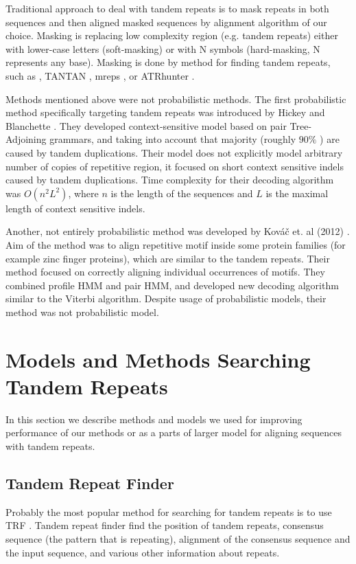 Traditional approach to deal with tandem repeats is to mask repeats in both
sequences and then aligned masked sequences by alignment algorithm of our
choice. Masking is replacing low complexity region (e.g. tandem repeats) either
with lower-case letters (soft-masking) or with N symbols (hard-masking, N
represents any base). Masking is done by method for finding tandem repeats,
such as  \cite{Benson1999}, TANTAN
\cite{Frith2011}, mreps \cite{Kolpakov2003}, or ATRhunter \cite{Wexler2005}. 

Methods mentioned above were not probabilistic methods. The first probabilistic
method specifically targeting tandem repeats was introduced by Hickey and
Blanchette \cite{Hickey2011}. They developed context-sensitive model based on
pair Tree-Adjoining grammars, and taking into account that majority (roughly
$90\%$  \cite{Hickey2011}) are caused by tandem duplications.  Their model does
not explicitly model arbitrary number of copies of repetitive region, it
focused on short context sensitive indels caused by tandem duplications.  Time
complexity for their decoding algorithm was $O(n^2L^2)$, where $n$ is the
length of the sequences and $L$ is the maximal length of context sensitive
indels.

Another, not entirely probabilistic method was developed by Kováč {et. al
(2012)} \nocite{Kovac2012}. Aim of the method was to align repetitive motif
inside some protein families (for example zinc finger proteins), which are
similar to the tandem repeats. Their method focused on correctly aligning
individual occurrences of motifs. They combined profile HMM and pair HMM, and
developed new decoding algorithm similar to the Viterbi algorithm. Despite
usage of probabilistic models, their method was not probabilistic model. 


\section{Models and Methods Searching Tandem Repeats}

In this section we describe methods and models we used for improving
performance of our methods or as a parts of larger model for aligning sequences
with tandem repeats. 

\subsection{Tandem Repeat Finder}

Probably the most popular method for searching for tandem repeats is to use TRF
\cite{Benson1999}.  Tandem repeat finder find the position of tandem repeats,
consensus sequence (the pattern that is repeating), alignment of the consensus
sequence and the input sequence, and various other information about repeats.

